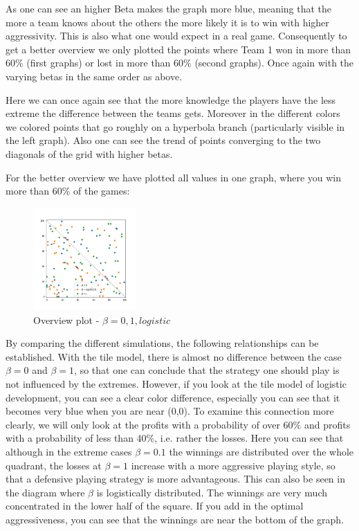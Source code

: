 As one can see an higher Beta makes the graph more blue, meaning that the more a team knows about the others the more likely it is to win with higher aggressivity. This is also what one would expect in a real game.
Consequently to get a better overview we only plotted the points where Team 1 won in more than 60$\%$ (first graphs) or lost in more than 60$\%$ (second graphs). Once again with the varying betas in the same order as above.

Here we can once again see that the more knowledge the players have the less extreme the difference between the teams gets. Moreover in the different colors we colored points that go roughly on a hyperbola branch (particularly visible in the left graph). Also one can see the trend of points converging to the two diagonals of the grid with higher betas.


For the better overview we have plotted all values in one graph, where you win  more than 60$\%$ of the games:

\begin{figure}[!ht]
    \centering
    \includegraphics[width=0.35\textwidth]{Bilder/simulation_16}
    \caption{Overview plot - $\beta=0,1,logistic$}
    \label{fig:meine-grafik}
\end{figure}

By comparing the different simulations, the following relationships can be established. With the tile model, there is almost no difference between the case $\beta=0$ and $\beta=1$, so that one can conclude that the strategy one should play is not influenced by the extremes. However, if you look at the tile model of logistic development, you can see a clear color difference, especially you can see that it becomes very blue when you are near (0,0). To examine this connection more clearly, we will only look at the profits with a probability of over 60$\%$ and profits with a probability of less than 40$\%$, i.e. rather the losses. Here you can see that although in the extreme cases $\beta=0.1$ the winnings are distributed over the whole quadrant, the losses at $\beta=1$ increase with a more aggressive playing style, so that a defensive playing strategy is more advantageous. This can also be seen in the diagram where $\beta$ is logistically distributed. The winnings are very much concentrated in the lower half of the square. If you add in the optimal aggressiveness, you can see that the winnings are near the bottom of the graph.


